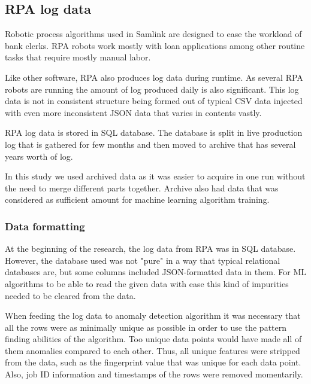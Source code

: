 
\subsection{RPA log data}\label{subsec:meth-rpa-log-data}
Robotic process algorithms used in Samlink
are designed
to ease the workload of bank clerks.
RPA robots
work mostly with loan applications
among other routine tasks
that require mostly manual labor.

Like other software,
RPA also produces log data during runtime.
As several RPA robots are running
the amount of log produced daily is also significant.
This log data is not in consistent structure
being formed out of typical CSV data
injected with even more inconsistent JSON data
that varies in contents vastly.

RPA log data is stored in SQL database.
The database is split in live production log
that is gathered for few months
and then moved to archive that has
several years worth of log.

In this study we used archived data
as it was easier to acquire in one run
without the need to merge different parts together.
Archive also had
data that was considered as sufficient amount
for machine learning algorithm training.

\subsubsection*{Data formatting}\label{subsubsec:data-formatting}
At the beginning of the research,
the log data from RPA was in SQL database.
However,
the database used was not "pure"
in a way that typical relational databases are,
but some columns included JSON-formatted data in them.
For ML algorithms to be able to read the given data with ease
this kind of impurities needed to be cleared from the data.

When feeding the log data to anomaly detection algorithm
it was necessary that all the rows were
as minimally unique as possible
in order to use the pattern finding abilities of the algorithm.
Too unique data points would have made all of them anomalies
compared to each other.
Thus, all unique features were stripped from the data,
such as the fingerprint value
that was unique for each data point.
Also,
job ID information and timestamps of the rows
were removed momentarily.

